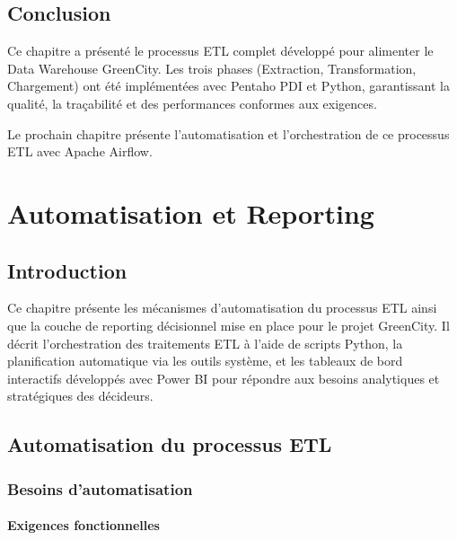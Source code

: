 \documentclass[12pt,a4paper]{report}
\begin{document}
\section{Conclusion}

Ce chapitre a présenté le processus ETL complet développé pour alimenter le Data Warehouse GreenCity. Les trois phases (Extraction, Transformation, Chargement) ont été implémentées avec Pentaho PDI et Python, garantissant la qualité, la traçabilité et des performances conformes aux exigences.

Le prochain chapitre présente l'automatisation et l'orchestration de ce processus ETL avec Apache Airflow.

\cleardoublepage


\chapter{Automatisation et Reporting}

\section{Introduction}

Ce chapitre présente les mécanismes d’automatisation du processus ETL ainsi que la couche de reporting décisionnel mise en place pour le projet GreenCity.  
Il décrit l’orchestration des traitements ETL à l’aide de scripts Python, la planification automatique via les outils système, et les tableaux de bord interactifs développés avec Power BI pour répondre aux besoins analytiques et stratégiques des décideurs.


\section{Automatisation du processus ETL}

\subsection{Besoins d’automatisation}

\subsubsection{Exigences fonctionnelles}
\end{document}
